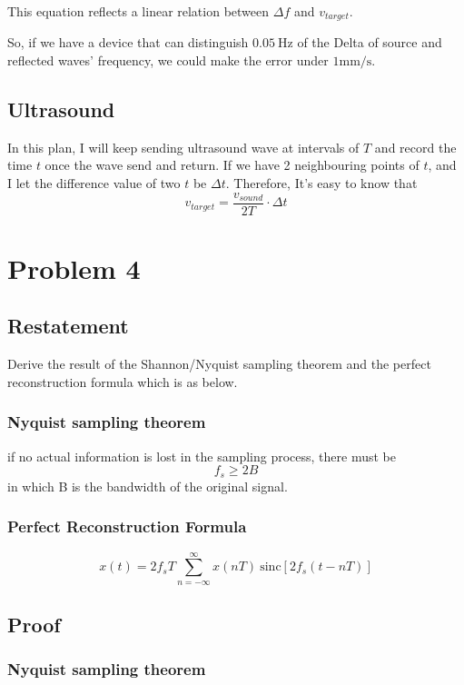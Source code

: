 \documentclass{article}
\begin{document}
This equation reflects a linear relation between $\Delta f$ and $v_{target}$.

So, if we have a device that can distinguish $0.05~\mathrm{Hz}$ of the Delta of source and reflected waves' frequency, we could make the error under $1\mathrm{mm/s}$.

\subsection{Ultrasound}
In this plan, I will keep sending ultrasound wave at intervals of $T$ and record the time $t$ once the wave send and return. If we have 2 neighbouring points of $t$, and I let the difference value of two $t$ be $\Delta t$. Therefore, It's easy to know that
\begin{equation}
    v_{target} = \frac{v_{sound}}{2T} \cdot \Delta t
\end{equation}


\section{Problem 4}
\subsection{Restatement}
Derive the result of the Shannon/Nyquist sampling theorem and the perfect reconstruction formula which is as below.
\subsubsection*{Nyquist sampling theorem}

if no actual information is lost in the sampling process, there must be
\begin{equation}
    f_s \geq 2B
\end{equation}
in which B is the bandwidth of the original signal.

\subsubsection*{Perfect Reconstruction Formula}
\begin{equation}
    x(t) = 2f_s T \sum_{n = -\infty}^{\infty} x(nT) ~ \mathrm{sinc} \left[ 2f_s (t - nT) \right]
\end{equation}
\subsection{Proof}
\subsubsection*{Nyquist sampling theorem}
\end{document}
